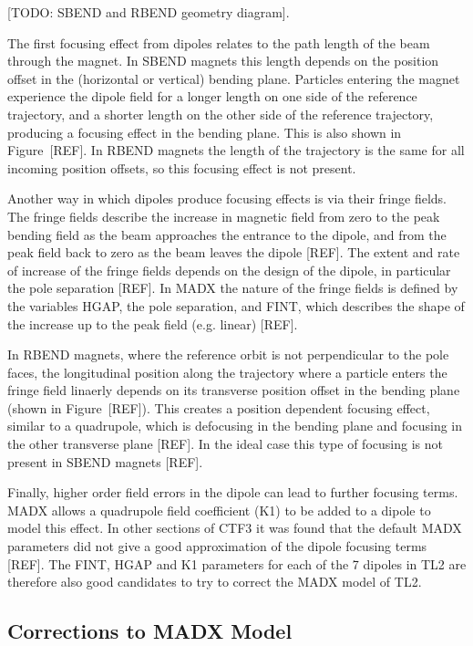 [TODO: SBEND and RBEND geometry diagram].

The first focusing effect from dipoles relates to the path length of the beam through the magnet. In SBEND magnets this length depends on the position offset in the (horizontal or vertical) bending plane. Particles entering the magnet experience the dipole field for a longer length on one side of the reference trajectory, and a shorter length on the other side of the reference trajectory, producing a focusing effect in the bending plane. This is also shown in Figure~[REF]. In RBEND magnets the length of the trajectory is the same for all incoming position offsets, so this focusing effect is not present.

Another way in which dipoles produce focusing effects is via their fringe fields. The fringe fields describe the increase in magnetic field from zero to the peak bending field as the beam approaches the entrance to the dipole, and from the peak field back to zero as the beam leaves the dipole [REF]. The extent and rate of increase of the fringe fields depends on the design of the dipole, in particular the pole separation [REF]. In MADX the nature of the fringe fields is defined by the variables HGAP, the pole separation, and FINT, which describes the shape of the increase up to the peak field (e.g. linear) [REF].

In RBEND magnets, where the reference orbit is not perpendicular to the pole faces, the longitudinal position along the trajectory where a particle enters the fringe field linaerly depends on its transverse position offset in the bending plane (shown in Figure~[REF]). This creates a position dependent focusing effect, similar to a quadrupole, which is defocusing in the bending plane and focusing in the other transverse plane [REF]. In the ideal case this type of focusing is not present in SBEND magnets [REF].

Finally, higher order field errors in the dipole can lead to further focusing terms. MADX allows a quadrupole field coefficient (K1) to be added to a dipole to model this effect. In other sections of CTF3 it was found that the default MADX parameters did not give a good approximation of the dipole focusing terms [REF]. The FINT, HGAP and K1 parameters for each of the 7 dipoles in TL2 are therefore also good candidates to try to correct the  MADX model of TL2.

\subsection{Corrections to MADX Model}
\label{ss:modelCorrections}


